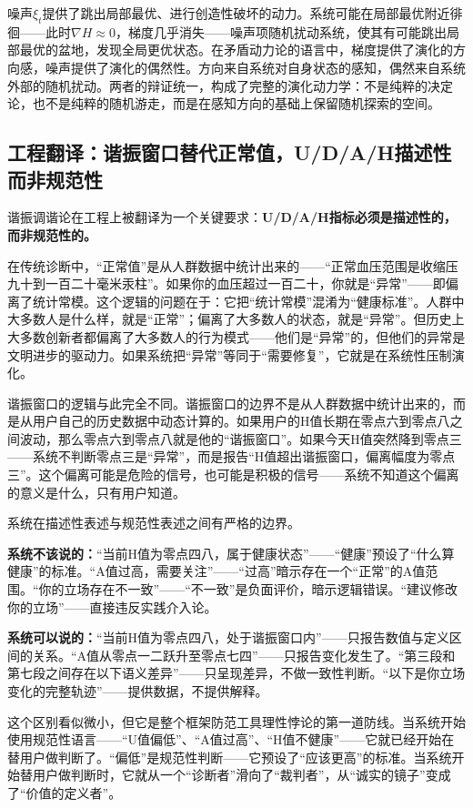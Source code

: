 \documentclass[11pt,a4paper]{book}
\theoremstyle{definition}
\begin{document}
噪声$\xi_t$提供了跳出局部最优、进行创造性破坏的动力。系统可能在局部最优附近徘徊——此时$\nabla H \approx 0$，梯度几乎消失——噪声项随机扰动系统，使其有可能跳出局部最优的盆地，发现全局更优状态。在矛盾动力论的语言中，梯度提供了演化的方向感，噪声提供了演化的偶然性。方向来自系统对自身状态的感知，偶然来自系统外部的随机扰动。两者的辩证统一，构成了完整的演化动力学：不是纯粹的决定论，也不是纯粹的随机游走，而是在感知方向的基础上保留随机探索的空间。

\subsection{工程翻译：谐振窗口替代正常值，U/D/A/H描述性而非规范性}

谐振调谐论在工程上被翻译为一个关键要求：\textbf{U/D/A/H指标必须是描述性的，而非规范性的。}

在传统诊断中，“正常值”是从人群数据中统计出来的——“正常血压范围是收缩压九十到一百二十毫米汞柱”。如果你的血压超过一百二十，你就是“异常”——即偏离了统计常模。这个逻辑的问题在于：它把“统计常模”混淆为“健康标准”。人群中大多数人是什么样，就是“正常”；偏离了大多数人的状态，就是“异常”。但历史上大多数创新者都偏离了大多数人的行为模式——他们是“异常”的，但他们的异常是文明进步的驱动力。如果系统把“异常”等同于“需要修复”，它就是在系统性压制演化。

谐振窗口的逻辑与此完全不同。谐振窗口的边界不是从人群数据中统计出来的，而是从用户自己的历史数据中动态计算的。如果用户的H值长期在零点六到零点八之间波动，那么零点六到零点八就是他的“谐振窗口”。如果今天H值突然降到零点三——系统不判断零点三是“异常”，而是报告“H值超出谐振窗口，偏离幅度为零点三”。这个偏离可能是危险的信号，也可能是积极的信号——系统不知道这个偏离的意义是什么，只有用户知道。

系统在描述性表述与规范性表述之间有严格的边界。

\textbf{系统不该说的：}“当前H值为零点四八，属于健康状态”——“健康”预设了“什么算健康”的标准。“A值过高，需要关注”——“过高”暗示存在一个“正常”的A值范围。“你的立场存在不一致”——“不一致”是负面评价，暗示逻辑错误。“建议修改你的立场”——直接违反实践介入论。

\textbf{系统可以说的：}“当前H值为零点四八，处于谐振窗口内”——只报告数值与定义区间的关系。“A值从零点一二跃升至零点七四”——只报告变化发生了。“第三段和第七段之间存在以下语义差异”——只呈现差异，不做一致性判断。“以下是你立场变化的完整轨迹”——提供数据，不提供解释。

这个区别看似微小，但它是整个框架防范工具理性悖论的第一道防线。当系统开始使用规范性语言——“U值偏低”、“A值过高”、“H值不健康”——它就已经开始在替用户做判断了。“偏低”是规范性判断——它预设了“应该更高”的标准。当系统开始替用户做判断时，它就从一个“诊断者”滑向了“裁判者”，从“诚实的镜子”变成了“价值的定义者”。
\end{document}

